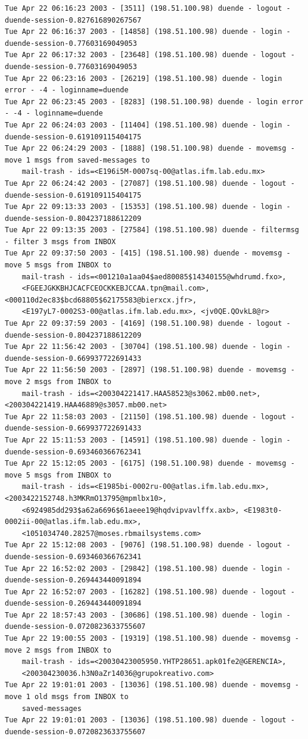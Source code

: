 \begin{lstlisting}[style=terminal]
Tue Apr 22 06:16:23 2003 - [3511] (198.51.100.98) duende - logout - duende-session-0.827616890267567
Tue Apr 22 06:16:37 2003 - [14858] (198.51.100.98) duende - login - duende-session-0.77603169049053
Tue Apr 22 06:17:32 2003 - [23648] (198.51.100.98) duende - logout - duende-session-0.77603169049053
Tue Apr 22 06:23:16 2003 - [26219] (198.51.100.98) duende - login error - -4 - loginname=duende
Tue Apr 22 06:23:45 2003 - [8283] (198.51.100.98) duende - login error - -4 - loginname=duende
Tue Apr 22 06:24:03 2003 - [11404] (198.51.100.98) duende - login - duende-session-0.619109115404175
Tue Apr 22 06:24:29 2003 - [1888] (198.51.100.98) duende - movemsg - move 1 msgs from saved-messages to 
    mail-trash - ids=<E196i5M-0007sq-00@atlas.ifm.lab.edu.mx>
Tue Apr 22 06:24:42 2003 - [27087] (198.51.100.98) duende - logout - duende-session-0.619109115404175
Tue Apr 22 09:13:33 2003 - [15353] (198.51.100.98) duende - login - duende-session-0.804237188612209
Tue Apr 22 09:13:35 2003 - [27584] (198.51.100.98) duende - filtermsg - filter 3 msgs from INBOX
Tue Apr 22 09:37:50 2003 - [415] (198.51.100.98) duende - movemsg - move 5 msgs from INBOX to 
    mail-trash - ids=<001210a1aa04$aed80085$14340155@whdrumd.fxo>, 
    <FGEEJGKKBHJCACFCEOCKKEBJCCAA.tpn@mail.com>, <000110d2ec83$bcd68805$62175583@bierxcx.jfr>, 
    <E197yL7-0002S3-00@atlas.ifm.lab.edu.mx>, <jv0QE.QOvkL8@r>
Tue Apr 22 09:37:59 2003 - [4169] (198.51.100.98) duende - logout - duende-session-0.804237188612209
Tue Apr 22 11:56:42 2003 - [30704] (198.51.100.98) duende - login - duende-session-0.669937722691433
Tue Apr 22 11:56:50 2003 - [2897] (198.51.100.98) duende - movemsg - move 2 msgs from INBOX to 
    mail-trash - ids=<200304221417.HAA58523@s3062.mb00.net>, <200304221419.HAA46889@s3057.mb00.net>
Tue Apr 22 11:58:03 2003 - [21150] (198.51.100.98) duende - logout - duende-session-0.669937722691433
Tue Apr 22 15:11:53 2003 - [14591] (198.51.100.98) duende - login - duende-session-0.693460366762341
Tue Apr 22 15:12:05 2003 - [6175] (198.51.100.98) duende - movemsg - move 5 msgs from INBOX to 
    mail-trash - ids=<E1985bi-0002ru-00@atlas.ifm.lab.edu.mx>, <2003422152748.h3MKRmO13795@mpmlbx10>, 
    <6924985dd293$a62a6696$61aeee19@hqdvipvavlffx.axb>, <E1983t0-0002ii-00@atlas.ifm.lab.edu.mx>, 
    <1051034740.28257@moses.rbmailsystems.com>
Tue Apr 22 15:12:08 2003 - [9076] (198.51.100.98) duende - logout - duende-session-0.693460366762341
Tue Apr 22 16:52:02 2003 - [29842] (198.51.100.98) duende - login - duende-session-0.269443440091894
Tue Apr 22 16:52:07 2003 - [16282] (198.51.100.98) duende - logout - duende-session-0.269443440091894
Tue Apr 22 18:57:43 2003 - [30686] (198.51.100.98) duende - login - duende-session-0.0720823633755607
Tue Apr 22 19:00:55 2003 - [19319] (198.51.100.98) duende - movemsg - move 2 msgs from INBOX to 
    mail-trash - ids=<20030423005950.YHTP28651.apk01fe2@GERENCIA>, 
    <200304230036.h3N0aZr14036@grupokreativo.com>
Tue Apr 22 19:01:01 2003 - [13036] (198.51.100.98) duende - movemsg - move 1 old msgs from INBOX to 
    saved-messages
Tue Apr 22 19:01:01 2003 - [13036] (198.51.100.98) duende - logout - duende-session-0.0720823633755607
\end{lstlisting}

